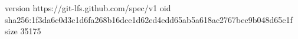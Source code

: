 version https://git-lfs.github.com/spec/v1
oid sha256:1f3da6c0d3c1d6fa268b16dce1d62ed4edd65ab5a618ac2767bec9b048d65c1f
size 35175

